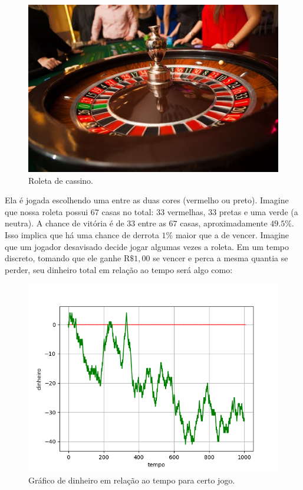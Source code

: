\documentclass[12pt]{article}
\begin{document}
\begin{figure}[H]
\centering
\includegraphics[scale=0.55]{roleta.jpg}
\caption{Roleta de cassino.}
\end{figure}

Ela é jogada escolhendo uma entre as duas cores (vermelho ou preto). Imagine que nossa roleta possui $67$ casas no total: $33$ vermelhas, $33$ pretas e uma verde (a neutra). A chance de vitória é de $33$ entre as $67$ casas, aproximadamente  $49.5\%$. Isso implica que há uma chance de derrota $1\%$ maior que a de vencer. Imagine que um jogador desavisado decide jogar algumas vezes a roleta. Em um tempo discreto, tomando que ele ganhe R$\$1,00$ se vencer e perca a mesma quantia se perder, seu dinheiro total em relação ao tempo será algo como:

\begin{figure}[H]
\centering
\includegraphics[scale=0.7]{graph4.png}
\caption{Gráfico de dinheiro em relação ao tempo para certo jogo.}
\end{figure}
\end{document}
